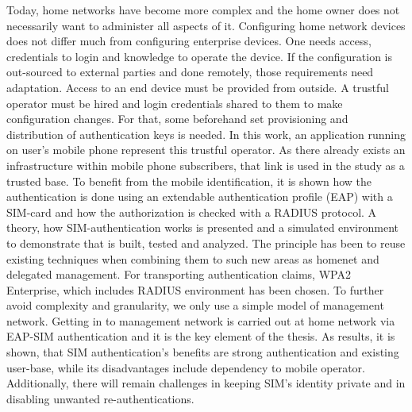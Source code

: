 \documentclass[12pt,a4paper,english]{tutthesis}
\begin{document}
Today, home networks have become more complex and the home owner 
does not necessarily want to administer all aspects of it.
Configuring home network devices does not differ much from configuring enterprise devices. One needs access, credentials to login and knowledge to operate the device. If the configuration is out-sourced to external parties and 
done remotely, those requirements need adaptation.
Access to an end device must be provided from outside. 
A trustful operator must be hired and login credentials shared to them to make configuration changes.
For that,  some beforehand set provisioning and distribution of authentication keys is needed.
In this work, an application running on user's mobile phone represent this trustful operator. 
As there already exists an infrastructure within mobile phone subscribers, that link is used in the study as a trusted base.
To benefit from the mobile identification, it is shown how
the authentication is done using an extendable authentication profile (EAP) with a SIM-card
and how the authorization is checked with a RADIUS protocol.
A theory, how SIM-authentication works is presented and a simulated environment
to demonstrate that is built, tested and analyzed.
The principle has been to reuse existing techniques when combining them to such new areas as homenet and delegated management.
 For transporting authentication claims, WPA2 Enterprise, which includes RADIUS environment has been chosen.
To further avoid complexity and granularity, we
only use a simple model of management network. Getting in to management network is carried out at home network via EAP-SIM authentication and it is the key element of the thesis.
As results, it is shown, that SIM authentication's benefits are strong
authentication and existing user-base, while its disadvantages include
dependency to mobile operator. Additionally, there will remain challenges in keeping SIM's identity private and in disabling unwanted re-authentications. %



\end{document}

